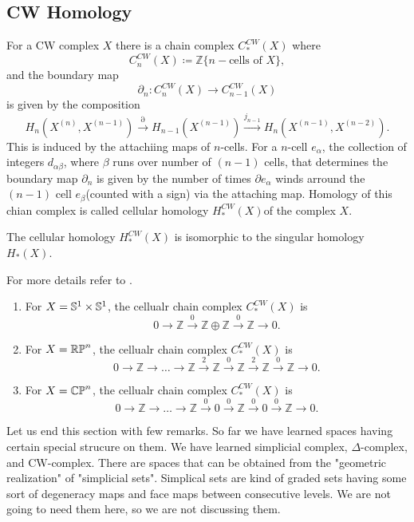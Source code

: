 \subsection{CW Homology}
For a CW complex \(X\) there is a chain complex \(C_\ast^{CW}(X)\) where 
\[C_n^{CW}(X)\coloneq \mathbb Z\{n-\text{cells of }X\},\]
and the boundary map 
\[\partial_n: C_n^{CW}(X) \to C_{n-1}^{CW}(X)\]
is given by the composition
\[H_n(X^{(n)}, X^{(n-1)}) \xrightarrow{\partial} H_{n-1}(X^{(n-1)})  \xrightarrow{j_{n-1}} H_n(X^{(n-1)}, X^{(n-2)}).\]
This is induced by the attachiing maps of \(n\)-cells.
For a \(n\)-cell \(e_\alpha\), the collection of integers \(d_{\alpha\beta}\), where \(\beta \) runs over number of \((n-1)\) cells, that determines the boundary map \(\partial_n\) is given by the number of times \(\partial e_\alpha\) winds arround the \((n-1)\) cell \(e_\beta\)(counted with a sign) via the attaching map.
Homology of this chian complex is called cellular homology \(H_\ast^{CW}(X)\)of the complex \(X\).
\begin{theorem}
	The cellular homology \(H_\ast^{CW}(X)\) is isomorphic to the singular homology \(H_\ast(X)\).
\end{theorem}
For more details refer to \cite[\S 2.2]{Hatcher2002}.

\begin{example}
	\begin{enumerate}
		\item For \(X = \mathbb{S}^{1} \times \mathbb{S}^{1}\), the cellualr chain complex
		\(C_\ast^{CW}(X)\) is 
		\[0 \to \mathbb Z \xrightarrow{0} \mathbb{Z} \oplus \mathbb Z \xrightarrow{0} \mathbb Z \to 0.\]
		\item For \(X = \mathbb{RP}^{n}\), the cellualr chain complex \(C_\ast^{CW}(X)\) is
		\[0 \to \mathbb Z \to \dots \to \mathbb Z \xrightarrow{2} \mathbb Z \xrightarrow{0} \mathbb Z\xrightarrow{2} \mathbb Z \xrightarrow{0} \mathbb Z \to 0.\]
		\item For \(X = \mathbb{CP}^{n}\), the cellualr chain complex \(C_\ast^{CW}(X)\) is
		\[0 \to \mathbb Z \to \dots \to \mathbb Z \xrightarrow{0} 0 \xrightarrow{0} \mathbb Z \xrightarrow{0} 0 \xrightarrow{0} \mathbb Z \to 0.\]
	\end{enumerate}
\end{example}

Let us end this section with few remarks.
So far we have learned spaces having certain special strucure on them.
We have learned simplicial complex, \(\Delta\)-complex, and CW-complex.
There are spaces that can be obtained from the "geometric realization" of "simplicial sets".
Simplical sets are kind of graded sets having some sort of degeneracy maps and face maps between consecutive levels.
We are not going to need them here, so we are not discussing them.

